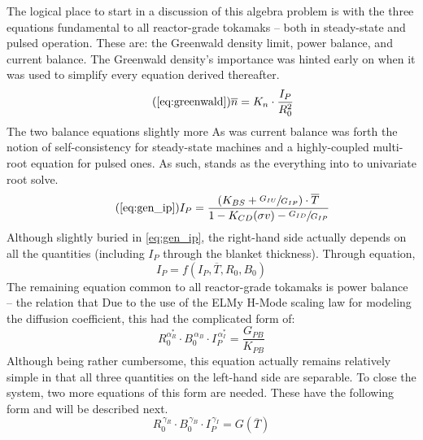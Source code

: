 The logical place to start in a discussion of this algebra problem is with the three equations fundamental to all reactor-grade tokamaks -- both in steady-state and pulsed operation. These are: the Greenwald density limit, power balance, and current balance. The Greenwald density's importance was hinted early on when it was used to simplify every equation derived thereafter. 
\begin{equation}
	\tag{\ref{eq:greenwald}}
	\overline n = K_n \cdot \frac{I_P}{R_0^2}
\end{equation}
The two balance equations  slightly more  As was  current balance  was  forth the notion of self-consistency for steady-state machines and a highly-coupled multi-root equation for pulsed ones. As such,  stands as the  everything  into to  univariate root solve.
\begin{equation}
	\tag{\ref{eq:gen_ip}}
	I_P = \frac{ \left( K_{BS} + \sfrac{ G_{IU} }{ G_{IP} } \right) \cdot \overline T }{ 1 - K_{CD} ( \sigma v ) - \sfrac{ G_{ID} }{ G_{IP} } }
\end{equation}
Although slightly buried in \cref{eq:gen_ip}, the right-hand side actually depends on all the quantities (including $I_P$ through the  blanket thickness). Through equation,
\begin{equation}
	I_P = f(I_P, \overline T, R_0, B_0)
\end{equation}
The remaining equation common to all reactor-grade tokamaks is power balance -- the relation that  Due to the use of the ELMy H-Mode scaling law for modeling the diffusion coefficient, this had the complicated form of:
\begin{equation}
	\label{eq:freidberg}
	R_0^{ \alpha_R^* } \cdot B_0^{\,\alpha_B} \cdot I_P^{\,\alpha_I^*} = \frac{ G_{PB} }{ K_{PB} }
\end{equation}
Although being rather cumbersome, this equation actually remains relatively simple in that all three quantities on the left-hand side are separable. To close the system, two more equations of this form are needed. These have the following form and will be described next.
\begin{equation}
	\label{eq:rbi}
	R_0^{\, \gamma_R} \cdot B_0^{\, \gamma_B} \cdot I_P^{\, \gamma_I} = G( \overline T )
\end{equation}

